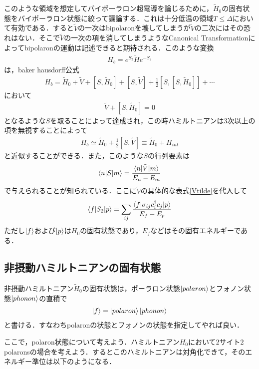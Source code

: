 \documentclass[a4j]{jarticle}
\begin{document}
このような領域を想定してバイポーラロン超電導を論じるために，$\tilde{H}_0$の固有状態をバイポーラロン状態に絞って議論する．これは十分低温の領域$T\le \Delta$において有効である．すると$\tilde{V}$の一次はbipolaronを壊してしまうが$\tilde{V}$の二次にはその恐れはない．そこで$\tilde{V}$の一次の項を消してしまうようなCanonical Transformationによってbipolaronの運動は記述できると期待される．このような変換
\begin{align}
 H_b=e^{S_2}\tilde{H}e^{-S_2}
\end{align}
は，baker hausdorff公式
\begin{align}
 H_b=\tilde{H}_0+\tilde{V}+\left[S,\tilde{H}_0\right]+\left[S,\tilde{V}\right]+\frac{1}{2}\left[S,\left[S,\tilde{H}_0\right]\right]+\cdots
\end{align}
において
\begin{align}
 \tilde{V}+\left[S,\tilde{H}_0\right]=0
\end{align}
となるような$S$を取ることによって達成され，この時ハミルトニアンは$3$次以上の項を無視することによって
\begin{align}
 H_b\simeq\tilde{H}_0+\frac{1}{2}\left[S,\tilde{V}\right]\equiv \tilde{H}_0+H_{int}\label{Hb}
\end{align}
と近似することができる．また，このような$S$の行列要素は
\begin{align}
 \braket{n|S|m}=\frac{\braket{n|\tilde{V}|m}}{E_n-E_m}
\end{align}
で与えられることが知られている．ここに$\tilde{V}$の具体的な表式\eqref{Vtilde}を代入して
\begin{align}
 \braket{f|S_2|p}=\sum_{ij}\frac{\braket{f|\sigma_{ij}c^{\dagger}_ic_j|p}}{E_f-E_p}
\end{align}
ただし$\ket{f}$および$\ket{p}$は$H_0$の固有状態であり，$E_f$などはその固有エネルギーである．

\subsection{非摂動ハミルトニアンの固有状態}
非摂動ハミルトニアン$\tilde{H}_0$の固有状態は，ポーラロン状態$\ket{polaron}$とフォノン状態$\ket{phonon}$の直積で
\begin{align*}
 \ket{f}=\ket{polaron}\ket{phonon}
\end{align*}
と書ける．すなわちpolaronの状態とフォノンの状態を指定してやれば良い．

ここで，polaron状態について考えよう．ハミルトニアン$H_0$において$2$サイト$2$polaronsの場合を考えよう．するとこのハミルトニアンは対角化できて，そのエネルギー準位は以下のようになる．
\end{document}

